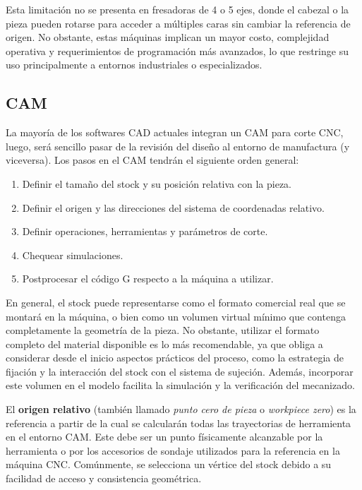 Esta limitación no se presenta en fresadoras de 4 o 5 ejes, donde el cabezal o la pieza pueden rotarse para acceder a múltiples caras sin cambiar la referencia de origen. No obstante, estas máquinas implican un mayor costo, complejidad operativa y requerimientos de programación más avanzados, lo que restringe su uso principalmente a entornos industriales o especializados.


\subsection{CAM}

La mayoría de los softwares CAD actuales integran un CAM para corte CNC, luego, será sencillo pasar de la revisión del diseño al entorno de manufactura (y viceversa). Los pasos en el CAM tendrán el siguiente orden general:

\begin{enumerate}
	\item Definir el tamaño del stock y su posición relativa con la pieza.
	\item Definir el origen y las direcciones del sistema de coordenadas relativo.
	\item Definir operaciones, herramientas y parámetros de corte.
	\item Chequear simulaciones.
	\item Postprocesar el código G respecto a la máquina a utilizar.
\end{enumerate}

En general, el stock puede representarse como el formato comercial real que se montará en la máquina, o bien como un volumen virtual mínimo que contenga completamente la geometría de la pieza. No obstante, utilizar el formato completo del material disponible es lo más recomendable, ya que obliga a considerar desde el inicio aspectos prácticos del proceso, como la estrategia de fijación y la interacción del stock con el sistema de sujeción. Además, incorporar este volumen en el modelo facilita la simulación y la verificación del mecanizado.

El \textbf{origen relativo} (también llamado \textit{punto cero de pieza} o \textit{workpiece zero}) es la referencia a partir de la cual se calcularán todas las trayectorias de herramienta en el entorno CAM. Este debe ser un punto físicamente alcanzable por la herramienta o por los accesorios de sondaje utilizados para la referencia en la máquina CNC. Comúnmente, se selecciona un vértice del stock debido a su facilidad de acceso y consistencia geométrica. 

